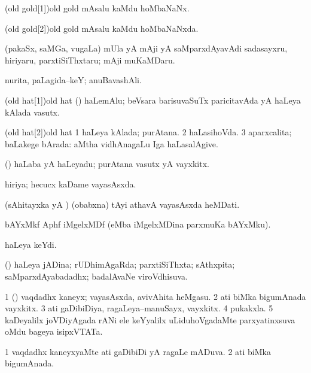 \bentry
\word(old gold[1]){old gold}
\gl{\nA}
\bmng
mAsalu kaMdu hoMbaNaNx. 
\emng
\eentry

\bentry
\word(old gold[2]){old gold}
\gl{\gu}
\bmng
mAsalu kaMdu hoMbaNaNxda. 
\emng
\eentry

\bentry
{}
\gl{\nA}
\bmng
(pakaSx, saMGa, \mo vugaLa) mUla yA mAji yA saMparxdAyavAdi sadasayxru, hiriyaru, parxtiSiThxtaru; mAji muKaMDaru. 
\emng
\eentry

\bentry
{}
\gl{\nA}
\bmng
nurita, paLagida--keY; anuBavashAli. 
\emng
\eentry

\bentry
\word(old hat[1]){old hat}
\gl{\nA}
\bmng
(\AmA) haLemAlu; beVsara barisuvaSuTx paricitavAda yA haLeya kAlada vasutx. 
\emng
\eentry

\bentry
\word(old hat[2]){old hat}
\gl{\gu}
\bmng
\bnum
\num{1} haLeya kAlada; purAtana. 
\num{2} haLasihoVda. 
\num{3} aparxcalita; baLakege bArada:  aMtha vidhAnagaLu Iga haLasalAgive. 
\enum
\emng
\eentry

\bentry
{}
\gl{\nA}
\bmng
(\AmA) haLaba yA haLeyadu; purAtana vasutx yA vayxkitx. 
\emng
\eentry

\bentry
{}
\gl{\gu}
\bmng
hiriya; hecucx kaDame vayasAsxda. 
\emng
\eentry

\bentry
{}
\gl{\nA}
\bmng
(sAhitayxka yA \AmA) (obabxna) tAyi athavA vayasAsxda heMDati. 
\emng

\noindent
\gl{\pagu}
\bmng
{} bAYxMkf Aphf iMgelxMDf (eMba iMgelxMDina parxmuKa bAYxMku). 
\emng
\eentry

\bentry
{}
\gl{\nA}
\bmng
haLeya keYdi. 
\emng
\eentry

\bentry
{}
\gl{\gu}
\bmng
(\ame) haLeya jADina; rUDhimAgaRda; parxtiSiThxta; sAthxpita; saMparxdAyabadadhx; badalAvaNe viroVdhisuva. 
\emng
\eentry

\bentry
{}
\gl{\nA}
\bmng
\bnum
\num{1} (\hiV) vaqdadhx kaneyx; vayasAsxda, avivAhita heMgasu. 
\num{2} ati biMka bigumAnada vayxkitx. 
\num{3} ati gaDibiDiya, ragaLeya--manuSayx, vayxkitx. 
\num{4} pukakxla. 
\num{5} kaDeyalilx joVDiyAgada rANi ele keYyalilx uLiduhoVgadaMte parxyatinxsuva oMdu bageya isipxVTATa. 
\enum
\emng
\eentry

\bentry
{}
\gl{\gu}
\bmng
\bnum
\num{1} vaqdadhx kaneyxyaMte ati gaDibiDi yA ragaLe mADuva. 
\num{2} ati biMka bigumAnada. 
\enum
\emng
\eentry

